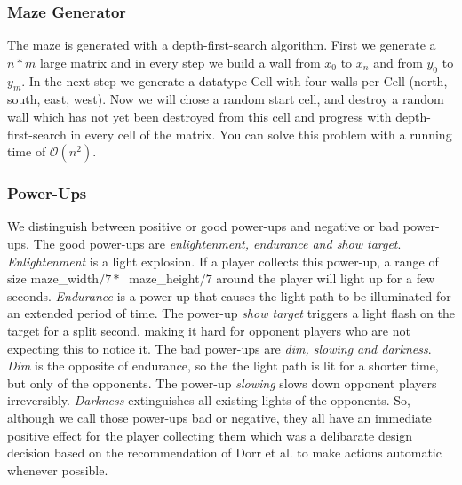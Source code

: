 \documentclass{sigchi}
\begin{document}
\subsubsection{Maze Generator} 
The maze is generated with a depth-first-search algorithm. First we generate a $n*m$ large matrix and in every step we build a wall from $x_{0}$ to $x_{n}$ and from $y_{0}$ to $y_{m}$. In the next step we generate a datatype Cell with four walls per Cell (north, south, east, west). Now we will chose a random start cell, and destroy a random wall which has not yet been destroyed from this cell and progress with depth-first-search in every cell of the matrix. You can solve this problem with a running time of $\mathcal{O}(n^2)$.

\subsubsection{Power-Ups} 
We distinguish between positive or good power-ups and negative or bad power-ups. The good power-ups are \textit{enlightenment, endurance and show target}. \textit{Enlightenment} is a light explosion. If a player collects this power-up, a range of size maze\_width$/7 *\;$ maze\_height$/7$ around the player will light up for a few seconds. \textit{Endurance} is a power-up that causes the light path to be illuminated for an extended period of time. The power-up \textit{show target} triggers a light flash on the target for a split second, making it hard for opponent players who are not expecting this to notice it. The bad power-ups are \textit{dim, slowing and darkness}. \textit{Dim} is the opposite of endurance, so the the light path is lit for a shorter time, but only of the opponents. The power-up \textit{slowing} slows down opponent players irreversibly. \textit{Darkness} extinguishes all existing lights of the opponents. So, although we call those power-ups bad or negative, they all have an immediate positive effect for the player collecting them which was a delibarate design decision based on the recommendation of Dorr et al. to make actions automatic whenever possible. \cite{dorr2009gaze}
\end{document}
